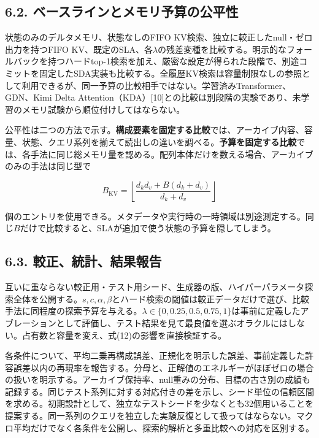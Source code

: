 \documentclass[11pt,a4paper]{article}
\begin{document}
\subsection{6.2. ベースラインとメモリ予算の公平性}\label{ux30d9ux30fcux30b9ux30e9ux30a4ux30f3ux3068ux30e1ux30e2ux30eaux4e88ux7b97ux306eux516cux5e73ux6027}

状態のみのデルタメモリ、状態なしのFIFO KV検索、独立に較正したnull・ゼロ出力を持つFIFO KV、既定のSLA、各\(\lambda\)の残差変種を比較する。明示的なフォールバックを持つハードtop-1検索を加え、厳密な設定が得られた段階で、別途コミットを固定したSDA実装も比較する。全履歴KV検索は容量制限なしの参照として利用できるが、同一予算の比較相手ではない。学習済みTransformer、GDN、Kimi Delta Attention（KDA）{[}10{]}との比較は別段階の実験であり、未学習のメモリ試験から順位付けしてはならない。

公平性は二つの方法で示す。\textbf{構成要素を固定する比較}では、アーカイブ内容、容量、状態、クエリ系列を揃えて読出しの違いを調べる。\textbf{予算を固定する比較}では、各手法に同じ総メモリ量を認める。配列本体だけを数える場合、アーカイブのみの手法は同じ型で

\nopagebreak[4]

\[
B_{\mathrm{KV}}=\left\lfloor\frac{d_kd_v+B(d_k+d_v)}{d_k+d_v}\right\rfloor
\tag{15}
\]

個のエントリを使用できる。メタデータや実行時の一時領域は別途測定する。同じ\(B\)だけで比較すると、SLAが追加で使う状態の予算を隠してしまう。

\subsection{6.3. 較正、統計、結果報告}\label{ux8f03ux6b63ux7d71ux8a08ux7d50ux679cux5831ux544a}

互いに重ならない較正用・テスト用シード、生成器の版、ハイパーパラメータ探索全体を公開する。\(s,c,\alpha,\beta\)とハード検索の閾値は較正データだけで選び、比較手法に同程度の探索予算を与える。\(\lambda\in\{0,0.25,0.5,0.75,1\}\)は事前に定義したアブレーションとして評価し、テスト結果を見て最良値を選ぶオラクルにはしない。占有数と容量を変え、式(12)の影響を直接検証する。

各条件について、平均二乗再構成誤差、正規化を明示した誤差、事前定義した許容誤差以内の再現率を報告する。分母と、正解値のエネルギーがほぼゼロの場合の扱いを明示する。アーカイブ保持率、null重みの分布、目標の古さ別の成績も記録する。同じテスト系列に対する対応付きの差を示し、シード単位の信頼区間を求める。初期設計として、独立なテストシードを少なくとも32個用いることを提案する。同一系列のクエリを独立した実験反復として扱ってはならない。マクロ平均だけでなく各条件を公開し、探索的解析と多重比較への対応を区別する。
\end{document}
